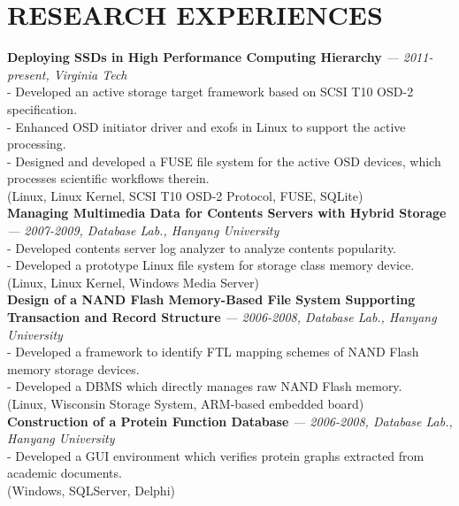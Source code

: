 \section{RESEARCH EXPERIENCES} 
\vspace{0.07in}
  {\bf Deploying SSDs in High Performance Computing Hierarchy}
    {\it \footnotesize --- 2011-present, Virginia Tech} \\
    - Developed an active storage target framework based on SCSI T10 OSD-2
    specification.\\
    - Enhanced OSD initiator driver and exofs in Linux to support the
    active processing.\\
    - Designed and developed a FUSE file system for the active OSD devices, which
    processes scientific workflows therein.\\
    {\footnotesize(Linux, Linux Kernel, SCSI T10 OSD-2 Protocol, FUSE, SQLite)}
    \vspace{0.03in}\\
  {\bf Managing Multimedia Data for Contents Servers with Hybrid Storage}
    {\it \footnotesize --- 2007-2009, Database Lab., Hanyang University}\\
    - Developed contents server log analyzer to analyze contents popularity.\\
    - Developed a prototype Linux file system for storage class memory device.\\
    {\footnotesize(Linux, Linux Kernel, Windows Media Server)}
    \vspace{0.03in}\\
  {\bf Design of a NAND Flash Memory-Based File System Supporting Transaction and
      Record Structure} 
    {\it \footnotesize --- 2006-2008, Database Lab., Hanyang University}\\
    - Developed a framework to identify FTL mapping schemes of NAND Flash memory
    storage devices.\\
    - Developed a DBMS which directly manages raw NAND Flash memory.\\
    {\footnotesize(Linux, Wisconsin Storage System, ARM-based embedded
     board)}
    \vspace{0.03in}\\
  {\bf Construction of a Protein Function Database} 
    {\it \footnotesize --- 2006-2008, Database Lab., Hanyang University}\\
    - Developed a GUI environment which verifies protein graphs extracted
    from academic documents.\\
    {\footnotesize(Windows, SQLServer, Delphi)}

